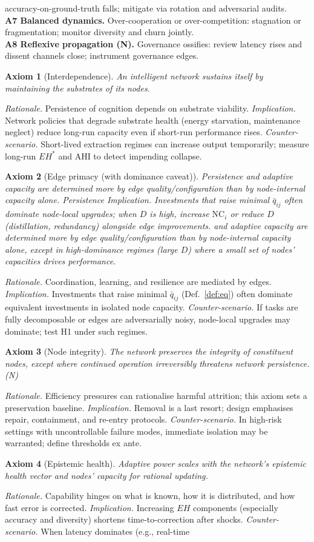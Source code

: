 \documentclass[12pt]{article}
\newtheorem{axiom}{Axiom}
\begin{document}
accuracy-on-ground-truth falls; mitigate via rotation and adversarial audits.\\ \textbf{A7 Balanced dynamics.} Over-cooperation or over-competition: stagnation or fragmentation; monitor diversity and churn jointly.\\ \textbf{A8 Reflexive propagation (N).} Governance ossifies: review latency rises and dissent channels close; instrument governance edges. \n\label{sec:axioms} \begin{axiom}[Interdependence] An intelligent network sustains itself by maintaining the substrates of its nodes. \end{axiom} \emph{Rationale.} Persistence of cognition depends on substrate viability. \emph{Implication.} Network policies that degrade substrate health (energy starvation, maintenance neglect) reduce long-run capacity even if short-run performance rises. \emph{Counter-scenario.} Short-lived extraction regimes can increase output temporarily; measure long-run $EH^{\ast}$ and AHI to detect impending collapse. \begin{axiom}[Edge primacy (with dominance caveat)] Persistence and adaptive capacity are determined more by edge quality/configuration than by node-internal capacity alone. Persistence \emph{Implication.} Investments that raise minimal $\bar q_{ij}$ often dominate node-local upgrades; when $D$ is high, increase $\mathrm{NC}_i$ or reduce $D$ (distillation, redundancy) alongside edge improvements. and adaptive capacity are determined more by edge quality/configuration than by node-internal capacity alone, \emph{except} in high-dominance regimes (large $D$) where a small set of nodes' capacities drives performance. \end{axiom} \emph{Rationale.} Coordination, learning, and resilience are mediated by edges. \emph{Implication.} Investments that raise minimal $\bar{q}_{ij}$ (Def.~\ref{def:eq}) often dominate equivalent investments in isolated node capacity. \emph{Counter-scenario.} If tasks are fully decomposable or edges are adversarially noisy, node-local upgrades may dominate; test H1 under such regimes. \begin{axiom}[Node integrity] The network preserves the integrity of constituent nodes, except where continued operation irreversibly threatens network persistence. (N) \end{axiom} \emph{Rationale.} Efficiency pressures can rationalise harmful attrition; this axiom sets a preservation baseline. \emph{Implication.} Removal is a last resort; design emphasises repair, containment, and re-entry protocols. \emph{Counter-scenario.} In high-risk settings with uncontrollable failure modes, immediate isolation may be warranted; define thresholds ex ante. \begin{axiom}[Epistemic health] Adaptive power scales with the network's epistemic health vector and nodes' capacity for rational updating. \end{axiom} \emph{Rationale.} Capability hinges on what is known, how it is distributed, and how fast error is corrected. \emph{Implication.} Increasing $EH$ components (especially accuracy and diversity) shortens time-to-correction after shocks. \emph{Counter-scenario.} When latency dominates (e.g., real-time 
\end{document}
